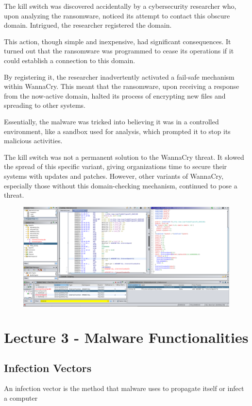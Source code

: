 \documentclass[]{project_plan}
\begin{document}
The kill switch was discovered accidentally by a cybersecurity researcher
who, upon analyzing the ransomware, noticed its attempt to contact this
obscure domain. Intrigued, the researcher registered the domain.

This action,
though simple and inexpensive, had significant consequences. It turned out
that the ransomware was programmed to cease its operations if it could
establish a connection to this domain.

By registering it, the researcher inadvertently
activated a fail-safe mechanism within WannaCry. This meant that the
ransomware, upon receiving a response from the now-active domain, halted its
process of encrypting new files and spreading to other systems.

Essentially, the
malware was tricked into believing it was in a controlled environment, like a
sandbox used for analysis, which prompted it to stop its malicious activities.

The kill switch was not a permanent solution to the WannaCry
threat. It slowed the spread of this specific variant,
giving organizations time to secure their systems with updates
and patches. However, other variants of WannaCry,
especially those without this domain-checking mechanism,
continued to pose a threat.

\begin{figure}[H]
  \centering
  \includegraphics[width=\linewidth]{lab2 kill switch.png}
\end{figure}

\chapter{Lecture 3 - Malware Functionalities}

\section{Infection Vectors}
An infection vector is the method that malware uses to propagate itself or infect a computer
\end{document}

